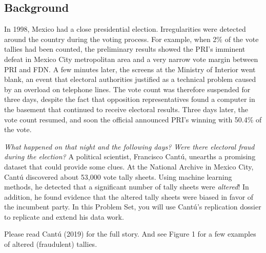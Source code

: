 \documentclass[
]{article}
\begin{document}
\clearpage

\hypertarget{background}{%
\subsection{Background}\label{background}}

In 1998, Mexico had a close presidential election. Irregularities were
detected around the country during the voting process. For example, when
2\% of the vote tallies had been counted, the preliminary results showed
the PRI's imminent defeat in Mexico City metropolitan area and a very
narrow vote margin between PRI and FDN. A few minutes later, the screens
at the Ministry of Interior went blank, an event that electoral
authorities justified as a technical problem caused by an overload on
telephone lines. The vote count was therefore suspended for three days,
despite the fact that opposition representatives found a computer in the
basement that continued to receive electoral results. Three days later,
the vote count resumed, and soon the official announced PRI's winning
with 50.4\% of the vote.

\emph{What happened on that night and the following days? Were there
electoral fraud during the election?} A political scientist, Francisco
Cantú, unearths a promising dataset that could provide some clues. At
the National Archive in Mexico City, Cantú discovered about 53,000 vote
tally sheets. Using machine learning methods, he detected that a
significant number of tally sheets were \emph{altered}! In addition, he
found evidence that the altered tally sheets were biased in favor of the
incumbent party. In this Problem Set, you will use Cantú's replication
dossier to replicate and extend his data work.

Please read Cantú (2019) for the full story. And see Figure 1 for a few
examples of altered (fraudulent) tallies.
\end{document}
